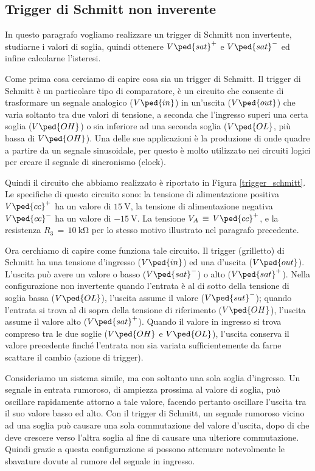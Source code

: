 \subsection*{Trigger di Schmitt non inverente}

In questo paragrafo vogliamo realizzare un trigger di Schmitt non invertente, studiarne i valori di soglia, quindi ottenere $V\ped{sat}^+$ e $V\ped{sat}^-$ ed infine calcolarne l'isteresi.

Come prima cosa cerciamo di capire cosa sia un trigger di Schmitt. Il trigger di Schmitt è un particolare tipo di comparatore, è un circuito che consente di trasformare un segnale analogico ($V\ped{in}$) in un'uscita ($V\ped{out}$) che varia soltanto tra due valori di tensione, a seconda che l'ingresso superi una certa soglia ($V\ped{OH}$) o sia inferiore ad una seconda soglia ($V\ped{OL}$, più bassa di $V\ped{OH}$). Una delle sue applicazioni è la produzione di onde quadre a partire da un segnale sinusoidale, per questo è molto utilizzato nei circuiti logici per creare il segnale di sincronismo (clock).

Quindi il circuito che abbiamo realizzato è riportato in Figura \ref{trigger_schmitt}. Le specifiche di questo circuito sono: la tensione di alimentazione positiva $V\ped{cc}^+$ ha un valore di $\SI{+15}{\volt}$, la tensione di alimentazione negativa $V\ped{cc}^-$ ha un valore di $\SI{-15}{\volt}$. La tensione $V_A\,\equiv\,V\ped{cc}^+$, e la resistenza $R_3\,=\,\SI{10}{\kilo\ohm}$ per lo stesso motivo illustrato nel paragrafo precedente. 

Ora cerchiamo di capire come funziona tale circuito. Il trigger (grilletto) di Schmitt ha una tensione d'ingresso ($V\ped{in}$) ed una d'uscita ($V\ped{out}$). L'uscita può avere un valore o basso ($V\ped{sat}^-$) o alto ($V\ped{sat}^+$).
Nella configurazione non invertente quando l'entrata è al di sotto della tensione di soglia bassa ($V\ped{OL}$), l'uscita assume il valore ($V\ped{sat}^-$); quando l'entrata si trova al di sopra della tensione di riferimento ($V\ped{OH}$), l'uscita assume il valore alto ($V\ped{sat}^+$). Quando il valore in ingresso si trova compreso tra le due soglie ($V\ped{OH}$ e $V\ped{OL}$), l'uscita conserva il valore precedente finché l'entrata non sia variata sufficientemente da farne scattare il cambio (azione di trigger).

Consideriamo un sistema simile, ma con soltanto una sola soglia d'ingresso. Un segnale in entrata rumoroso, di ampiezza prossima al valore di soglia, può oscillare rapidamente attorno a tale valore, facendo pertanto oscillare l'uscita tra il suo valore basso ed alto. Con il trigger di Schmitt, un segnale rumoroso vicino ad una soglia può causare una sola commutazione del valore d'uscita, dopo di che deve crescere verso l'altra soglia al fine di causare una ulteriore commutazione. Quindi grazie a questa configurazione si possono attenuare notevolmente le sbavature dovute al rumore del segnale in ingresso.

